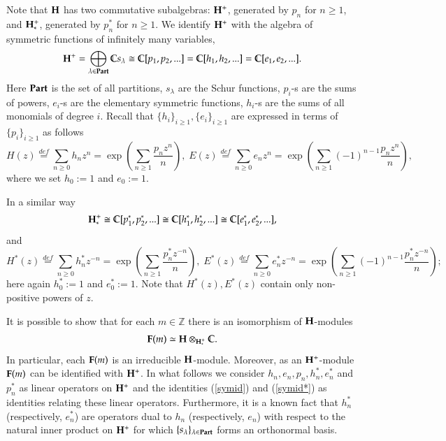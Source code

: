 \documentclass[11pt]{amsart}
\begin{document}
Note that $\bold{H}$ has two commutative subalgebras: 
$\bold {H}^+$, generated by $p_n$ for $n\geq 1$, and $\bold {H}^+_*$, generated by $p_n^*$ for $n\geq 1$.
We identify $\bold{H}^+$ with the algebra  
of symmetric functions of infinitely many variables,
$$\bold{H}^+=\bigoplus_{\lambda\in\bold{Part}}\mathbb{C} s_\lambda\cong\mathbb{C}[p_1,p_2,...]=\mathbb{C}[h_1,h_2,...]=\mathbb{C}[e_1,e_2,...].$$
Here $\bold{Part}$ is the set of all partitions, $s_\lambda$ are the
Schur functions, $p_i$-s are the sums of powers, $e_i$-s are the
elementary symmetric functions, $h_i$-s are the sums of all monomials of
degree $i$. Recall  \cite{M} that $\{h_i\}_{i\geq 1},\{e_i\}_{i\geq 1}$ 
are expressed in terms of  $\{p_i\}_{i\geq 1}$ as follows
\begin{equation}\label{symid}
H(z)\stackrel{def}{=}\sum_{n\geq 0}h_n z^n=\exp\left(\sum_{n\geq 1}\frac{p_n z^n}{n}\right),\;
E(z)\stackrel{def}{=}\sum_{n\geq 0}e_n z^n=\exp\left(\sum_{n\geq  1}(-1)^{n-1}\frac{p_n z^n}{n}\right),
\end{equation}
where we set $h_0:=1$ and $e_0:=1$. 

In a similar way   
$$\bold{H}^+_*\cong\mathbb{C}[p^*_1,p^*_2,...]\cong\mathbb{C}[h^*_1,h^*_2,...]\cong\mathbb{C}[e^*_1,e^*_2,...],$$
and 
\begin{equation}\label{symid*}
H^*(z)\stackrel{def}{=}\sum_{n\geq 0}h^*_n z^{-n}=\exp\left(\sum_{n\geq 1}\frac{p^*_n z^{-n}}{n}\right),\;
E^*(z)\stackrel{def}{=}\sum_{n\geq 0}e^*_n z^{-n}=\exp\left(\sum_{n\geq 1}(-1)^{n-1}\frac{p^*_n z^{-n}}{n}\right);
\end{equation}
here again $h^*_0:=1$ and $e^*_0:=1$. Note that $H^*(z),E^*(z)$ 
contain only non-positive powers of $z$.

It is possible to show \cite{DJKM} that for each $m\in\mathbb Z$
there is an isomorphism of $\bold{H}$-modules 
$$\bold F(m)\simeq\bold H\otimes_{\bold H_*^+}\mathbb C.$$ 
In particular, each $\bold{F}(m)$ is an irreducible
$\bold{H}$-module. Moreover, as an $\bold{H}^+$-module $\bold{F}(m)$ 
can be identified with $\bold{H}^+$.
In what follows we consider $h_n,e_n,p_n,h^*_n,e_n^*$ and $p_n^*$ as 
linear operators on $\bold{H}^+$ and the identities
(\ref{symid}) and (\ref{symid*}) as  identities relating these
linear operators. Furthermore, it is a known fact that $h_n^*$ (respectively, $e_n^*$) are operators dual to
$h_n$ (respectively, $e_n$)  with respect  to the natural inner product on $\bold{H}^+$ for which
$\{s_\lambda\}_{\lambda\in\bold{Part}}$ forms an orthonormal basis.
\end{document}
